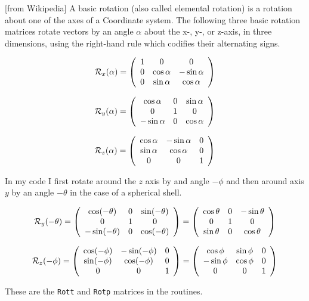 [from Wikipedia] A basic rotation (also called elemental rotation) is a rotation about one of the axes of a Coordinate system. 
The following three basic rotation matrices rotate vectors by an angle $\alpha$ 
about the x-, y-, or z-axis, in three dimensions, using the right-hand rule which codifies their 
alternating signs. 

\[
{\cal R}_x(\alpha)=
\left(
\begin{array}{ccc}
1 & 0 & 0 \\
0 & \cos\alpha & -\sin\alpha \\
0 & \sin\alpha & \cos\alpha
\end{array}
\right)
\]

\[
{\cal R}_y(\alpha)=
\left(
\begin{array}{ccc}
\cos\alpha & 0 & \sin\alpha \\
0 & 1 & 0 \\
-\sin\alpha & 0 &\cos\alpha
\end{array}
\right)
\]

\[
{\cal R}_z(\alpha)=
\left(
\begin{array}{ccc}
\cos\alpha & -\sin\alpha & 0\\
\sin\alpha & \cos\alpha & 0 \\
0 & 0 & 1 
\end{array}
\right)
\]

In my \elefant code
I first rotate around the $z$ axis by and angle $-\phi$ and then 
around axis $y$ by an angle $-\theta$ in the case of a spherical shell.

\[
{\cal R}_y(-\theta)=
\left(
\begin{array}{ccc}
\cos(-\theta) & 0 & \sin(-\theta) \\
0 & 1 & 0 \\
-\sin(-\theta) & 0 &\cos(-\theta)
\end{array}
\right)
=
\left(
\begin{array}{ccc}
\cos\theta & 0 & -\sin\theta \\
0 & 1 & 0 \\
\sin\theta & 0 &\cos\theta
\end{array}
\right)
\]

\[
{\cal R}_z(-\phi)
=
\left(
\begin{array}{ccc}
\cos(-\phi)& -\sin(-\phi) & 0\\
\sin(-\phi)& \cos(-\phi) & 0 \\
0 & 0 & 1 
\end{array}
\right)
=
\left(
\begin{array}{ccc}
\cos\phi& \sin\phi & 0\\
-\sin\phi& \cos\phi & 0 \\
0 & 0 & 1 
\end{array}
\right)
\]

These are the {\tt Rott} and {\tt Rotp} matrices in the routines.



